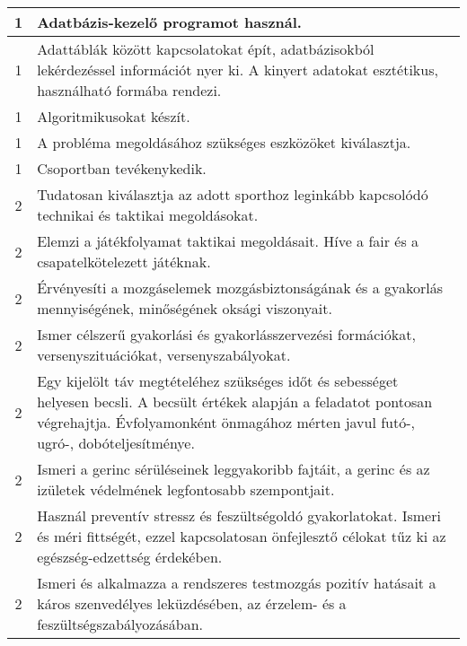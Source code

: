 \begin{longtable}{c | p{12cm} }
                                          1 &  Adatbázis-kezelő programot használ. \\ \hline
                                          1 &  Adattáblák között kapcsolatokat épít, adatbázisokból lekérdezéssel információt nyer ki. A kinyert adatokat esztétikus, használható formába rendezi. \\ \hline
                                          1 &  Algoritmikusokat készít. \\ \hline
                                          1 &  A probléma megoldásához szükséges eszközöket kiválasztja. \\ \hline
                                          1 &  Csoportban tevékenykedik. \\ \hline
                                      
                                
                                          2 &  Tudatosan kiválasztja az adott sporthoz leginkább kapcsolódó technikai és taktikai megoldásokat. \\ \hline
                                          2 &  Elemzi a játékfolyamat taktikai megoldásait. Híve a fair és a csapatelkötelezett játéknak. \\ \hline
                                          2 &  Érvényesíti a mozgáselemek mozgásbiztonságának és a gyakorlás mennyiségének, minőségének oksági viszonyait. \\ \hline
                                          2 &  Ismer célszerű gyakorlási és gyakorlásszervezési formációkat, versenyszituációkat, versenyszabályokat. \\ \hline
                                          2 &  Egy kijelölt táv megtételéhez szükséges időt és sebességet helyesen becsli. A becsült értékek alapján a feladatot pontosan végrehajtja. Évfolyamonként önmagához mérten javul futó-, ugró-, dobóteljesítménye. \\ \hline
                                          2 &  Ismeri a gerinc sérüléseinek leggyakoribb fajtáit, a gerinc és az izületek védelmének legfontosabb szempontjait. \\ \hline
                                          2 &  Használ preventív stressz és feszültségoldó gyakorlatokat. Ismeri és méri fittségét, ezzel kapcsolatosan önfejlesztő célokat tűz ki az egészség-edzettség érdekében. \\ \hline
                                          2 &  Ismeri és alkalmazza a rendszeres testmozgás pozitív hatásait a káros szenvedélyes leküzdésében, az érzelem- és a feszültségszabályozásában. \\ \hline

\end{longtable}
